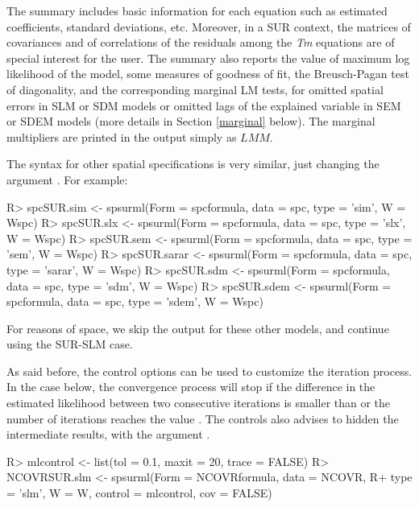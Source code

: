 \documentclass[article]{jss}
\begin{document}
The summary includes basic information for each equation such as estimated coefficients, standard deviations, etc. Moreover, in a SUR context, the matrices of covariances and of correlations of the residuals among the \emph{Tm} equations are of special interest for the user. The summary also reports the value of maximum log likelihood of the model, some measures of goodness of fit, the Breusch-Pagan test of diagonality, \citep{BP1980} and the corresponding marginal LM tests, for omitted spatial errors in SLM or SDM models or omitted lags of the explained variable in SEM or SDEM models (more details in Section \ref{marginal} below). The marginal multipliers are printed in the output simply as \(LMM\).

The syntax for other spatial specifications is very similar, just changing the argument . For example:

\begin{CodeChunk}

\begin{CodeInput}
R> spcSUR.sim <- spsurml(Form = spcformula, data = spc, type = 'sim', W = Wspc)
R> spcSUR.slx <- spsurml(Form = spcformula, data = spc, type = 'slx', W = Wspc)
R> spcSUR.sem <- spsurml(Form = spcformula, data = spc, type = 'sem', W = Wspc)
R> spcSUR.sarar <- spsurml(Form = spcformula, data = spc, type = 'sarar', W = Wspc)
R> spcSUR.sdm <- spsurml(Form = spcformula, data = spc, type = 'sdm', W = Wspc)
R> spcSUR.sdem <- spsurml(Form = spcformula, data = spc, type = 'sdem', W = Wspc)
\end{CodeInput}
\end{CodeChunk}

For reasons of space, we skip the output for these other models, and continue using the SUR-SLM case.

As said before, the control options can be used to customize the iteration process. In the case below, the convergence process will stop if the difference in the estimated likelihood between two consecutive iterations is smaller than  or the number of iterations reaches the value . The controls also advises to hidden the intermediate results, with the argument .

\begin{CodeChunk}

\begin{CodeInput}
R> mlcontrol <- list(tol = 0.1, maxit = 20, trace = FALSE)
R> NCOVRSUR.slm <- spsurml(Form = NCOVRformula, data = NCOVR,
R+                       type = 'slm', W = W, control = mlcontrol, cov = FALSE)
\end{CodeInput}
\end{CodeChunk}
\end{document}
